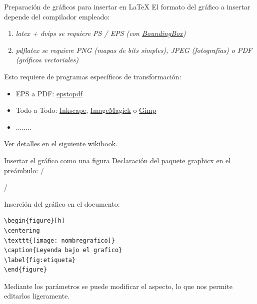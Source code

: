 \documentclass[10pt]{beamer}
\begin{document}
\begin{frame}{Preparaci\'on de gr\'aficos para insertar en \LaTeX}
El formato del gr\'afico a insertar depende del compilador empleado:
\begin{enumerate}
\item \it{latex + dvips}  se requiere PS / EPS {\scriptsize(con \href{http://tex.stackexchange.com/questions/133786/no-boundingbox-error-message}{\color{blue}BoundingBox})}
\item \it {pdflatex} se requiere PNG {\scriptsize(mapas de bits simples)}, JPEG {\scriptsize(fotograf\'ias)} o PDF {\scriptsize(gr\'aficos vectoriales)}
\end{enumerate}

\vspace{0.5cm}
Esto requiere de programas espec\'ificos de transformaci\'on:
\begin{itemize}
\item {\sc EPS a PDF}: \href{http://tug.org/epstopdf/}{\color{blue}epstopdf}
\item {\sc Todo a Todo}: \href{http://www.inkscape.org/es/}{\color{blue}Inkscape}, 
\href{http://www.imagemagick.org}{\color{blue}ImageMagick} o \href{http://www.gimp.org/}{\color{blue}Gimp}
\item ........
\end{itemize}
Ver detalles en el siguiente  \href{https://w.wiki/9Luv}{\color{blue}wikibook}.
\end{frame}

\begin{frame}[fragile]{Insertar el gr\'afico como una figura}
Declaraci\'on del paquete graphicx en el pre\'ambulo:
/ \usepackage{graphicx} /

Inserci\'on del gr\'afico en el documento: 
\begin{verbatim}
\begin{figure}[h]
\centering
\texttt{[image: nombregrafico]}
\caption{Leyenda bajo el grafico}
\label{fig:etiqueta}
\end{figure}
\end{verbatim}

Mediante los par\'ametros se puede modificar el aspecto, lo que 
nos permite editarlos ligeramente.
\end{frame}
\end{document}
